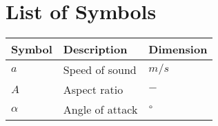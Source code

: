 \section*{List of Symbols}\label{cha:listofsymbols}
\begin{table}[h]
\centering
\begin{tabular}{l p{320pt} l}
Symbol & Description & Dimension\\
\hline
\hline
$a$ & Speed of sound & $m/s$\\
\hline
$A$ & Aspect ratio & $-$\\
\hline
$\alpha$ & Angle of attack & $\degree$\\
\hline
\end{tabular}
\end{table}
